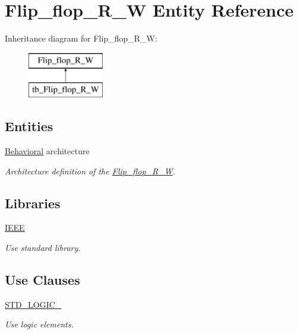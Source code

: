 \hypertarget{class_flip__flop___r___w}{}\section{Flip\+\_\+flop\+\_\+\+R\+\_\+W Entity Reference}
\label{class_flip__flop___r___w}
Inheritance diagram for Flip\+\_\+flop\+\_\+\+R\+\_\+W\+:\begin{figure}[H]
\begin{center}
\leavevmode
\includegraphics[height=2.000000cm]{class_flip__flop___r___w}
\end{center}
\end{figure}
\subsection*{Entities}
\begin{DoxyCompactItemize}
\item 
\hyperlink{class_flip__flop___r___w_1_1_behavioral}{Behavioral} architecture
\begin{DoxyCompactList}\small\item\em Architecture definition of the \hyperlink{class_flip__flop___r___w}{Flip\+\_\+flop\+\_\+\+R\+\_\+W}. \end{DoxyCompactList}\end{DoxyCompactItemize}
\subsection*{Libraries}
 \begin{DoxyCompactItemize}
\item 
\hyperlink{class_flip__flop___r___w_ae4f03c286607f3181e16b9aa12d0c6d4}{I\+E\+EE} \hypertarget{class_flip__flop___r___w_ae4f03c286607f3181e16b9aa12d0c6d4}{}\label{class_flip__flop___r___w_ae4f03c286607f3181e16b9aa12d0c6d4}

\begin{DoxyCompactList}\small\item\em Use standard library. \end{DoxyCompactList}\end{DoxyCompactItemize}
\subsection*{Use Clauses}
 \begin{DoxyCompactItemize}
\item 
\hyperlink{class_flip__flop___r___w_aa4b2b25246a821511120e3149b003563}{S\+T\+D\+\_\+\+L\+O\+G\+I\+C\+\_}   \hypertarget{class_flip__flop___r___w_aa4b2b25246a821511120e3149b003563}{}\label{class_flip__flop___r___w_aa4b2b25246a821511120e3149b003563}

\begin{DoxyCompactList}\small\item\em Use logic elements. \end{DoxyCompactList}\end{DoxyCompactItemize}
